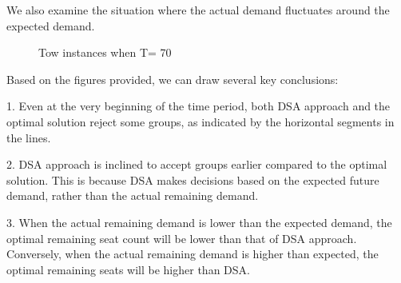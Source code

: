 We also examine the situation where the actual demand fluctuates around the expected demand.

\newpage

\begin{figure}[h]
  \centering
  \caption{Tow instances when T= 70}
\end{figure}

Based on the figures provided, we can draw several key conclusions:

1. Even at the very beginning of the time period, both DSA approach and the optimal solution reject some groups, as indicated by the horizontal segments in the lines.

2. DSA approach is inclined to accept groups earlier compared to the optimal solution. This is because DSA makes decisions based on the expected future demand, rather than the actual remaining demand.

3. When the actual remaining demand is lower than the expected demand, the optimal remaining seat count will be lower than that of DSA approach. Conversely, when the actual remaining demand is higher than expected, the optimal remaining seats will be higher than DSA.


